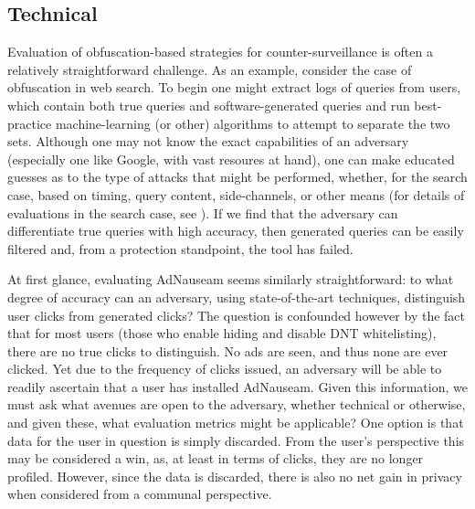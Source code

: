 \documentclass[conference]{IEEEtran}
\begin{document}
\subsection{Technical}

Evaluation of obfuscation-based strategies for counter-surveillance is often a relatively straightforward challenge. As an example, consider the case of obfuscation in web search. To begin one might extract logs of queries from users, which contain both true queries and software-generated queries and run best-practice machine-learning (or other) algorithms to attempt to separate the two sets. Although one may not know the exact capabilities of an adversary (especially one like Google, with vast resoures at hand), one can make educated guesses as to the type of attacks that might be performed, whether, for the search case, based on timing, query content, side-channels, or other means (for  details of evaluations in the search case, see \cite{Gervais,Balsa}).  If we find that the adversary can differentiate true queries with high accuracy, then generated queries can be easily filtered and, from a protection standpoint, the tool has failed.

At first glance, evaluating AdNauseam seems similarly straightforward: to what degree of accuracy can an adversary, using state-of-the-art techniques, distinguish user clicks from generated clicks? The question is confounded however by the fact that for most users (those who enable hiding and disable DNT whitelisting), there are no true clicks to distinguish. No ads are seen, and thus none are ever clicked. Yet due to the frequency of clicks issued, an adversary will be able to readily ascertain that a user has installed AdNauseam. Given this information, we must ask what avenues are open to the adversary, whether technical or otherwise, and given these, what evaluation metrics might be applicable? One option is that data for the user in question is simply discarded. From the user's perspective this may be considered a win, as, at least in terms of clicks, they are no longer profiled. However, since the data is discarded, there is also no net gain in privacy when considered from a communal perspective.
\end{document}
